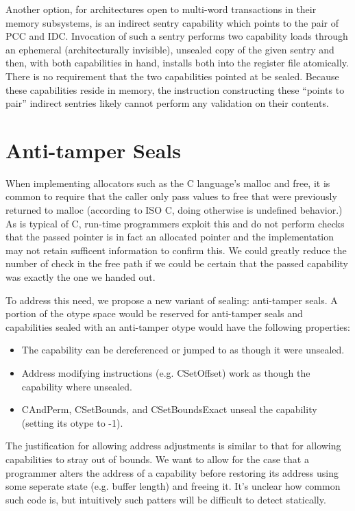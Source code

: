 Another option, for architectures open to multi-word transactions in their
memory subsystems, is an indirect sentry capability which points to the pair of
PCC and IDC.  Invocation of such a sentry performs two capability loads through
an ephemeral (architecturally invisible), unsealed copy of the given sentry and
then, with both capabilities in hand, installs both into the register file
atomically.  There is no requirement that the two capabilities pointed at be
sealed.  Because these capabilities reside in memory, the instruction
constructing these ``points to pair'' indirect sentries likely cannot perform
any validation on their contents.

\section{Anti-tamper Seals}
\label{sec:anti-tamper}

When implementing allocators such as the C language's malloc and free,
it is common to require that the caller only pass values to free that
were previously returned to malloc (according to ISO C, doing otherwise
is undefined behavior.)
As is typical of C, run-time programmers exploit this and do not perform
checks that the passed pointer is in fact an allocated pointer and the
implementation may not retain sufficent information to confirm this.
We could greatly reduce the number of check in the free path if we could
be certain that the passed capability was exactly the one we handed out.

To address this need, we propose a new variant of sealing: anti-tamper seals.
A portion of the otype space would be reserved for anti-tamper seals
and capabilities sealed with an anti-tamper otype would have the following
properties:
\begin{itemize}
  \item The capability can be dereferenced or jumped to as though it were
  unsealed.
%
  \item Address modifying instructions (e.g. CSetOffset) work as though
  the capability where unsealed.
%
  \item CAndPerm, CSetBounds, and CSetBoundsExact unseal the capability
  (setting its otype to -1).
\end{itemize}

The justification for allowing address adjustments is similar to that
for allowing capabilities to stray out of bounds.
We want to allow for the case that a programmer alters the address
of a capability before restoring its address using some seperate state
(e.g. buffer length) and freeing it.
It's unclear how common such code is, but intuitively such patters
will be difficult to detect statically.

